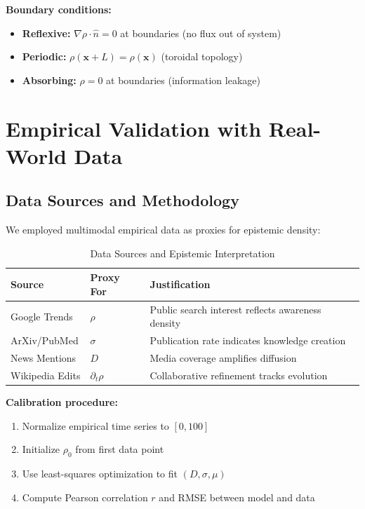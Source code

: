 \documentclass[12pt]{article}
\begin{document}
\textbf{Boundary conditions:}
\begin{itemize}
    \item \textbf{Reflexive:} $\nabla\rho \cdot \hat{n} = 0$ at boundaries (no flux out of system)
    \item \textbf{Periodic:} $\rho(\mathbf{x} + L) = \rho(\mathbf{x})$ (toroidal topology)
    \item \textbf{Absorbing:} $\rho = 0$ at boundaries (information leakage)
\end{itemize}

\section{Empirical Validation with Real-World Data}

\subsection{Data Sources and Methodology}

We employed multimodal empirical data as proxies for epistemic density:

\begin{table}[h]
\centering
\caption{Data Sources and Epistemic Interpretation}
\begin{tabular}{@{}lll@{}}
\toprule
\textbf{Source} & \textbf{Proxy For} & \textbf{Justification} \\
\midrule
Google Trends & $\rho$ & Public search interest reflects awareness density \\
ArXiv/PubMed & $\sigma$ & Publication rate indicates knowledge creation \\
News Mentions & $D$ & Media coverage amplifies diffusion \\
Wikipedia Edits & $\partial_t\rho$ & Collaborative refinement tracks evolution \\
\bottomrule
\end{tabular}
\label{tab:sources}
\end{table}

\textbf{Calibration procedure:}
\begin{enumerate}
    \item Normalize empirical time series to $[0, 100]$
    \item Initialize $\rho_0$ from first data point
    \item Use least-squares optimization to fit $(D, \sigma, \mu)$
    \item Compute Pearson correlation $r$ and RMSE between model and data
\end{enumerate}
\end{document}
